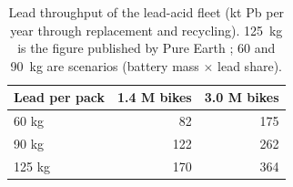 \begin{table}[t]
\centering\small
\caption{Lead throughput of the lead-acid fleet (kt Pb per year through replacement and recycling). 125~kg is the figure published by Pure Earth \citep{pureearth_smep}; 60 and 90~kg are scenarios (battery mass $\times$ lead share).}
\label{tab:lead}
\begin{tabular}{lrr}
\toprule
Lead per pack & 1.4 M bikes & 3.0 M bikes \\
\midrule
60 kg & 82 & 175 \\
90 kg & 122 & 262 \\
125 kg & 170 & 364 \\
\bottomrule
\end{tabular}
\end{table}
